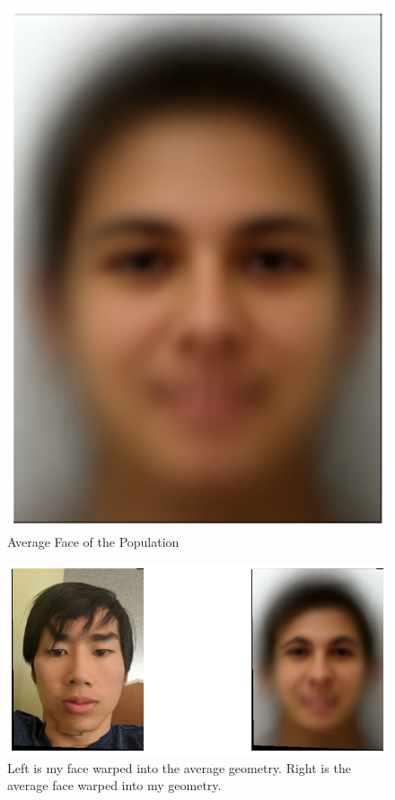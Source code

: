\documentclass{article}
\begin{document}
\begin{figure}[!htb]
    \centering
    \includegraphics[scale=0.5]{im7.png}
    \caption{Average Face of the Population}
\end{figure}

\begin{figure}[!htb]
    \centering
    \includegraphics[scale=0.5]{im8.png}
    \caption{Left is my face warped into the average geometry. Right is the average face warped into my geometry.}
\end{figure}
\newpage
\end{document}
